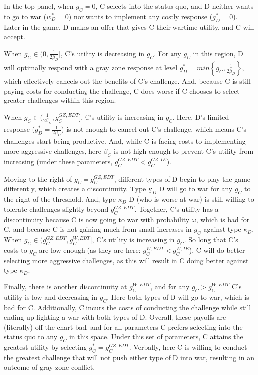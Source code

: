 \documentclass[11pt,letterpaper,pdftex,dvipsnames,table]{article}
\begin{document}
In the top panel, when $g_{C}=0$, C selects into the status quo, and D neither wants to go to war ($w_{D}^*=0$) nor wants to implement any costly response ($g_{D}^{*}=0$). Later in the game, D makes an offer that gives C their wartime utility, and C will accept. 

When $g_{C}\in(0,\frac{1}{2\beta_{D}}]$, C's utility is decreasing in $g_{C}$. For any $g_{C}$ in this region, D will optimally respond with a gray zone response at level $g_{D}^{*}=min\left\{ g_{C},\frac{1}{2\beta_{D}}\right\}$, which effectively cancels out the benefits of C's challenge. And, because C is still paying costs for conducting the challenge, C does worse if C chooses to select greater challenges within this region.

When $g_{C}\in(\frac{1}{2\beta_{D}},g_{C}^{GZ,EDT}]$, C's utility is increasing in $g_{C}$. Here, D's limited response ($g_{D}^{*}=\frac{1}{2\beta_{D}})$ is not enough to cancel out C's challenge, which means C's challenges start being productive. And, while C is facing costs to implementing more aggressive challenges, here $\beta_{C}$ is not high enough to prevent C's utility from increasing (under these parameters, $g_{C}^{GZ,EDT}<g_{C}^{GZ,IE}$).

Moving to the right of $g_{C}=g_{C}^{GZ,EDT}$, different types of D begin to play the game differently, which creates a discontinuity. Type $\underline{\kappa}_{D}$ D will go to war for any $g_{C}$ to the right of the threshold. And, type $\bar{\kappa}_{D}$ D (who is worse at war) is still willing to tolerate challenges slightly beyond $g_{C}^{GZ,EDT}$. Together, C's utility has a discontinuity because C is now going to war with probability $\omega$, which is bad for C, and because C is not gaining much from small increases in $g_{C}$ against type $\bar{\kappa}_{D}$. When $g_{C}\in(g_{C}^{GZ,EDT},g_{C}^{W,EDT}]$, C's utility is increasing in $g_{C}$. So long that C's costs to $g_{C}$ are low enough (as they are here: $g_{C}^{W,EDT}<g_{C}^{W,IE}$), C will do better selecting more aggressive challenges, as this will result in C doing better against type $\bar{\kappa}_{D}$.

Finally, there is another discontinuity at $g_{C}^{W,EDT}$, and for any $g_{C}>g_{C}^{W,EDT}$ C's utility is low and decreasing in $g_{C}$. Here both types of D will go to war, which is bad for C. Additionally, C incurs the costs of conducting the challenge while still ending up fighting a war with both types of D. Overall, these payoffs are (literally) off-the-chart bad, and for all parameters C prefers selecting into the status quo to any $g_{C}$ in this space. Under this set of parameters, C attains the greatest utility by selecting $g_{C}^{*}=g_{C}^{GZ,EDT}$. Verbally, here C is willing to conduct the greatest challenge that will not push either type of D into war, resulting in an outcome of gray zone conflict.
\end{document}
